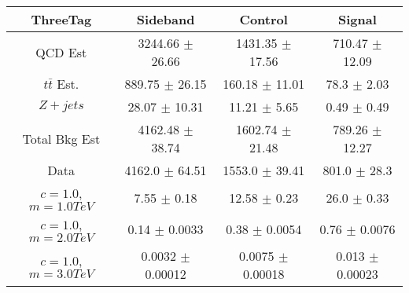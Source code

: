 \begin{footnotesize} 
\begin{tabular}{c|c|c|c} 
ThreeTag & Sideband & Control & Signal \\ 
\hline\hline 
QCD Est & 3244.66 $\pm$ 26.66 & 1431.35 $\pm$ 17.56 & 710.47 $\pm$ 12.09\\ 
$t\bar{t}$ Est.  & 889.75 $\pm$ 26.15 & 160.18 $\pm$ 11.01 & 78.3 $\pm$ 2.03\\ 
$Z+jets$ & 28.07 $\pm$ 10.31 & 11.21 $\pm$ 5.65 & 0.49 $\pm$ 0.49\\ 
Total Bkg Est & 4162.48 $\pm$ 38.74 & 1602.74 $\pm$ 21.48 & 789.26 $\pm$ 12.27\\ 
Data & 4162.0 $\pm$ 64.51 & 1553.0 $\pm$ 39.41 & 801.0 $\pm$ 28.3\\ 
$c=1.0$,$m=1.0TeV$ & 7.55 $\pm$ 0.18 & 12.58 $\pm$ 0.23 & 26.0 $\pm$ 0.33\\ 
$c=1.0$,$m=2.0TeV$ & 0.14 $\pm$ 0.0033 & 0.38 $\pm$ 0.0054 & 0.76 $\pm$ 0.0076\\ 
$c=1.0$,$m=3.0TeV$ & 0.0032 $\pm$ 0.00012 & 0.0075 $\pm$ 0.00018 & 0.013 $\pm$ 0.00023\\ 
\hline\hline 
\end{tabular} 
\end{footnotesize} 
\newline 
